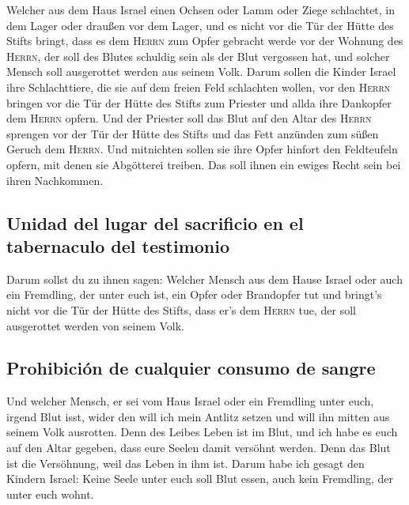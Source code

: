 Welcher aus dem Haus Israel einen Ochsen oder Lamm oder
Ziege schlachtet, in dem Lager oder draußen vor dem Lager,
 und es nicht vor die Tür der Hütte des Stifts bringt,
dass es dem \textsc{Herrn} zum Opfer gebracht werde vor der Wohnung des
\textsc{Herrn}, der soll des Blutes schuldig sein als der Blut vergossen
hat, und solcher Mensch soll ausgerottet werden aus seinem Volk.
 Darum sollen die Kinder Israel ihre Schlachttiere, die
sie auf dem freien Feld schlachten wollen, vor den \textsc{Herrn}
bringen vor die Tür der Hütte des Stifts zum Priester und allda ihre
Dankopfer dem \textsc{Herrn} opfern.  Und der Priester
soll das Blut auf den Altar des \textsc{Herrn} sprengen vor der Tür der
Hütte des Stifts und das Fett anzünden zum süßen Geruch dem
\textsc{Herrn}.  Und mitnichten sollen sie ihre Opfer
hinfort den Feldteufeln opfern, mit denen sie Abgötterei treiben. Das
soll ihnen ein ewiges Recht sein bei ihren Nachkommen.

\hypertarget{unidad-del-lugar-del-sacrificio-en-el-tabernaculo-del-testimonio}{%
\subsection{Unidad del lugar del sacrificio en el tabernaculo del
testimonio}\label{unidad-del-lugar-del-sacrificio-en-el-tabernaculo-del-testimonio}}

 Darum sollst du zu ihnen sagen: Welcher Mensch aus dem
Hause Israel oder auch ein Fremdling, der unter euch ist, ein Opfer oder
Brandopfer tut  und bringt's nicht vor die Tür der Hütte
des Stifts, dass er's dem \textsc{Herrn} tue, der soll ausgerottet
werden von seinem Volk.

\hypertarget{prohibiciuxf3n-de-cualquier-consumo-de-sangre}{%
\subsection{Prohibición de cualquier consumo de
sangre}\label{prohibiciuxf3n-de-cualquier-consumo-de-sangre}}

 Und welcher Mensch, er sei vom Haus Israel oder ein
Fremdling unter euch, irgend Blut isst, wider den will ich mein Antlitz
setzen und will ihn mitten aus seinem Volk ausrotten. 
Denn des Leibes Leben ist im Blut, und ich habe es euch auf den Altar
gegeben, dass eure Seelen damit versöhnt werden. Denn das Blut ist die
Versöhnung, weil das Leben in ihm ist.  Darum habe ich
gesagt den Kindern Israel: Keine Seele unter euch soll Blut essen, auch
kein Fremdling, der unter euch wohnt.

